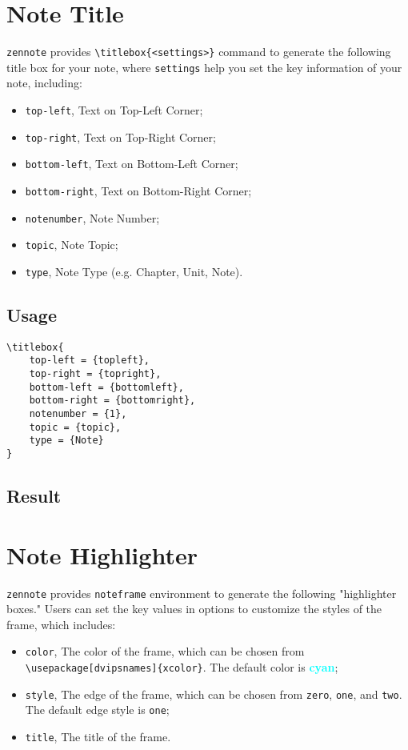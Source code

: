 \documentclass{article}
\begin{document}
\newpage

\section{Note Title}
{\tt zennote} provides \verb+\titlebox{<settings>}+ command to generate the following title box for your note, where {\tt settings} help you set the key information of your note, including:
\begin{itemize}
    \item \verb+top-left+, Text on Top-Left Corner;
    \item \verb+top-right+, Text on Top-Right Corner;
    \item \verb+bottom-left+, Text on Bottom-Left Corner;
    \item \verb+bottom-right+, Text on Bottom-Right Corner;
    \item \verb+notenumber+, Note Number;
    \item \verb+topic+, Note Topic;
    \item \verb+type+, Note Type (e.g. Chapter, Unit, Note).
\end{itemize}

\subsection{Usage}
\begin{flushleft}
\begin{verbatim}
\titlebox{
    top-left = {topleft},
    top-right = {topright},
    bottom-left = {bottomleft},
    bottom-right = {bottomright},
    notenumber = {1},
    topic = {topic},
    type = {Note}
}    
\end{verbatim}
\end{flushleft}

\subsection{Result}

\newpage

\section{Note Highlighter}
{\tt zennote} provides \verb+noteframe+ environment to generate the following "highlighter boxes." Users can set the key values in options to customize the styles of the frame, which includes:
\begin{itemize}
    \item \verb+color+, The color of the frame, which can be chosen from  \verb+\usepackage[dvipsnames]{xcolor}+. The default color is \textcolor{cyan}{\bf cyan};
    \item \verb+style+, The edge of the frame, which can be chosen from  \verb+zero+, \verb+one+, and \verb+two+. The default edge style is \verb+one+;
    \item \verb+title+, The title of the frame.
\end{itemize}
\end{document}
